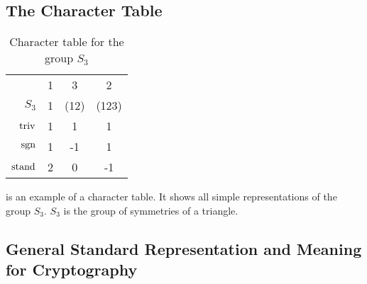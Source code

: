 \subsection{The Character Table}


\begin{table}
    \centering

    \begin{tabular}{r | c  c  c}
                    & 1 & 3     & 2     \\
        $S_3$       & 1 & (12)  & (123) \\ \hline
        $\operatorname{triv}$     & 1 & 1     & 1     \\
        $\operatorname{sgn}$      & 1 & -1    & 1     \\
        $\operatorname{stand}$    & 2 & 0     & -1
    \end{tabular}

    \caption{Character table for the group $S_3$}
    \label{tab:reprep.char.table}
\end{table}

 is an example of a character table.
It shows all simple representations of the group $S_3$.
$S_3$ is the group of symmetries of a triangle.

\subsection{General Standard Representation and Meaning for Cryptography}
